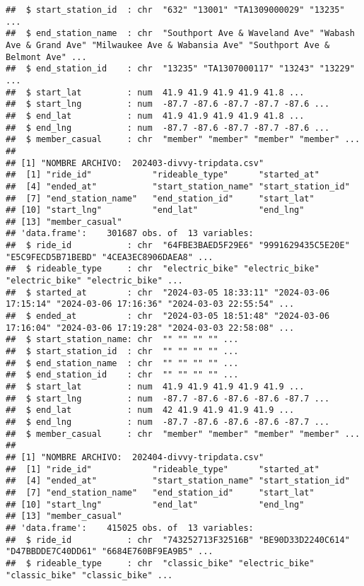 \documentclass[
]{article}
\begin{document}
\begin{verbatim}
##  $ start_station_id  : chr  "632" "13001" "TA1309000029" "13235" ...
##  $ end_station_name  : chr  "Southport Ave & Waveland Ave" "Wabash Ave & Grand Ave" "Milwaukee Ave & Wabansia Ave" "Southport Ave & Belmont Ave" ...
##  $ end_station_id    : chr  "13235" "TA1307000117" "13243" "13229" ...
##  $ start_lat         : num  41.9 41.9 41.9 41.9 41.8 ...
##  $ start_lng         : num  -87.7 -87.6 -87.7 -87.7 -87.6 ...
##  $ end_lat           : num  41.9 41.9 41.9 41.9 41.8 ...
##  $ end_lng           : num  -87.7 -87.6 -87.7 -87.7 -87.6 ...
##  $ member_casual     : chr  "member" "member" "member" "member" ...
## 
## [1] "NOMBRE ARCHIVO:  202403-divvy-tripdata.csv"
##  [1] "ride_id"            "rideable_type"      "started_at"        
##  [4] "ended_at"           "start_station_name" "start_station_id"  
##  [7] "end_station_name"   "end_station_id"     "start_lat"         
## [10] "start_lng"          "end_lat"            "end_lng"           
## [13] "member_casual"     
## 'data.frame':    301687 obs. of  13 variables:
##  $ ride_id           : chr  "64FBE3BAED5F29E6" "9991629435C5E20E" "E5C9FECD5B71BEBD" "4CEA3EC8906DAEA8" ...
##  $ rideable_type     : chr  "electric_bike" "electric_bike" "electric_bike" "electric_bike" ...
##  $ started_at        : chr  "2024-03-05 18:33:11" "2024-03-06 17:15:14" "2024-03-06 17:16:36" "2024-03-03 22:55:54" ...
##  $ ended_at          : chr  "2024-03-05 18:51:48" "2024-03-06 17:16:04" "2024-03-06 17:19:28" "2024-03-03 22:58:08" ...
##  $ start_station_name: chr  "" "" "" "" ...
##  $ start_station_id  : chr  "" "" "" "" ...
##  $ end_station_name  : chr  "" "" "" "" ...
##  $ end_station_id    : chr  "" "" "" "" ...
##  $ start_lat         : num  41.9 41.9 41.9 41.9 41.9 ...
##  $ start_lng         : num  -87.7 -87.6 -87.6 -87.6 -87.7 ...
##  $ end_lat           : num  42 41.9 41.9 41.9 41.9 ...
##  $ end_lng           : num  -87.7 -87.6 -87.6 -87.6 -87.7 ...
##  $ member_casual     : chr  "member" "member" "member" "member" ...
## 
## [1] "NOMBRE ARCHIVO:  202404-divvy-tripdata.csv"
##  [1] "ride_id"            "rideable_type"      "started_at"        
##  [4] "ended_at"           "start_station_name" "start_station_id"  
##  [7] "end_station_name"   "end_station_id"     "start_lat"         
## [10] "start_lng"          "end_lat"            "end_lng"           
## [13] "member_casual"     
## 'data.frame':    415025 obs. of  13 variables:
##  $ ride_id           : chr  "743252713F32516B" "BE90D33D2240C614" "D47BBDDE7C40DD61" "6684E760BF9EA9B5" ...
##  $ rideable_type     : chr  "classic_bike" "electric_bike" "classic_bike" "classic_bike" ...

\end{verbatim}
\end{document}
